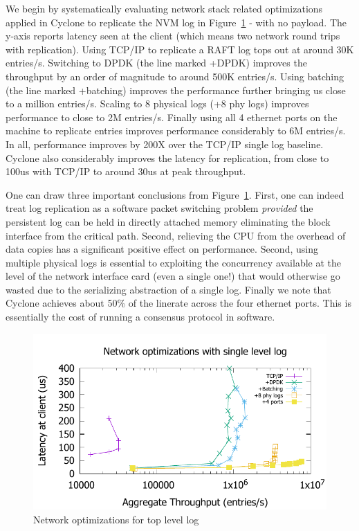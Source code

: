 \documentclass[pageno]{jpaper}
\begin{document}
We begin by systematically evaluating network stack related optimizations
applied in Cyclone to replicate the NVM log in Figure~\ref{fig:network_opts} -
with no payload. The y-axis reports latency seen at the client (which means two
network round trips with replication). Using TCP/IP to replicate a RAFT log tops
out at around 30K entries/s.  Switching to DPDK (the line marked +DPDK) improves
the throughput by an order of magnitude to around 500K entries/s. Using batching
(the line marked +batching) improves the performance further bringing us close
to a million entries/s. Scaling to 8 physical logs (+8 phy logs) improves
performance to close to 2M entries/s. Finally using all 4 ethernet ports on the
machine to replicate entries improves performance considerably to 6M
entries/s. In all, performance improves by 200X over the TCP/IP single log
baseline. Cyclone also considerably improves the latency for replication, from
close to 100us with TCP/IP to around 30us at peak throughput. 

One can draw three important conclusions from
Figure~\ref{fig:network_opts}. First, one can indeed treat log replication as a
software packet switching problem \emph{provided} the persistent log can be held
in directly attached memory eliminating the block interface from the critical
path. Second, relieving the CPU from the overhead of data copies has a
significant positive effect on performance. Second, using multiple physical
logs is essential to exploiting the concurrency available at the level of the
network interface card (even a single one!) that would otherwise go wasted due
to the serializing abstraction of a single log. Finally we note that Cyclone
achieves about 50\% of the linerate across the four ethernet
ports. This is essentially the cost of running a consensus protocol in
software.

\begin{figure}
\includegraphics[scale=0.6]{results2/network_opts.pdf}
\caption{Network optimizations for top level log}
\label{fig:network_opts}
\end{figure}
\end{document}
